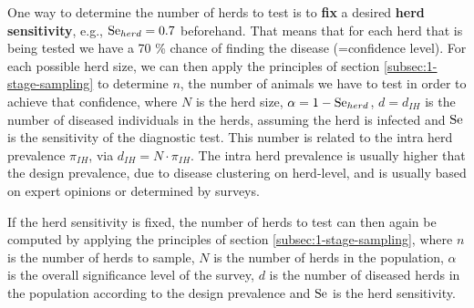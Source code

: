 \documentclass[nojss]{jss}
\begin{document}
One way to determine the number of herds to test is to \textbf{fix} a desired \textbf{herd sensitivity}, e.g., $\mbox{Se}_{herd} = 0.7$ beforehand. That means that for each herd that is being tested we have a 70 \% chance of finding the disease (=confidence level). For each possible herd size, we can then apply the principles of section \ref{subsec:1-stage-sampling} to determine $n$, the number of animals we have to test in order to achieve that confidence, where $N$ is the herd size, $\alpha = 1 - \mbox{Se}_{herd}$, $d=d_{IH}$ is the number of diseased individuals in the herds, assuming the herd is infected and $\mbox{Se}$ is the sensitivity   of the diagnostic test. This number is related to the intra herd prevalence   $\pi_{IH}$, via $d_{IH} = N\cdot \pi_{IH}$. The intra herd prevalence is usually higher that the design prevalence, due to disease clustering on herd-level, and is usually based on expert opinions or determined by surveys.

If the herd sensitivity   is fixed, the number of herds to test can then again be computed by applying the principles of section \ref{subsec:1-stage-sampling}, where $n$ is the number of herds to sample, $N$ is the number of herds in the population, $\alpha$ is the overall significance level    of the survey, $d$ is the number of diseased herds in the population according to the design prevalence   and $\mbox{Se}$ is the herd sensitivity.
\end{document}
